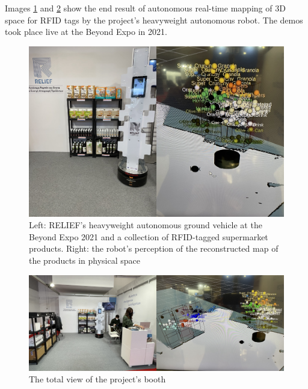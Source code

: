 \begin{minipage}[t][\textheight]{\textwidth}
Images \ref{fig:relief_beyond_1} and \ref{fig:relief_beyond_2} show the end
result of autonomous real-time mapping of 3D space for RFID tags by the
project's heavyweight autonomous robot. The demos took place live at the Beyond
Expo in 2021.

\vfill

\begin{figure}[H]\centering
  \includegraphics[scale=0.4]{images/relief_1.png}
  \caption{\small Left: RELIEF's heavyweight autonomous ground vehicle at the
           Beyond Expo 2021 and a collection of RFID-tagged supermarket
           products. Right: the robot's perception of the reconstructed map of
           the products in physical space}
  \label{fig:relief_beyond_1}
\end{figure}

\vfill

\begin{figure}[H]\centering
  \includegraphics[scale=0.4]{images/relief_2.png}
  \caption{\small The total view of the project's booth}
  \label{fig:relief_beyond_2}
\end{figure}
\end{minipage}


